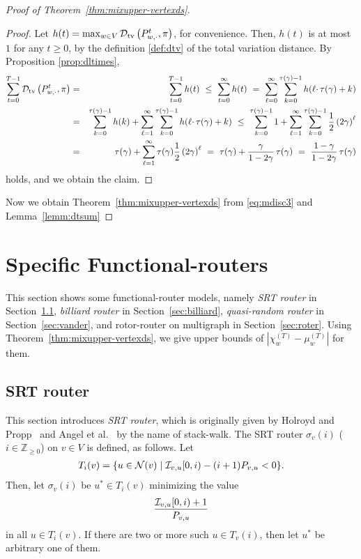 \documentclass[letter, 11pt]{article}
\newcommand{\1}{\mbox{1}\hspace{-0.25em}\mbox{l}}
\newcommand{\I}{{\cal I}} \newcommand{\C}{{\cal C}} \newcommand{\dtv}{{\cal D}_{\rm tv}}
\begin{document}
\begin{proof}[Proof of Theorem~\ref{thm:mixupper-vertexds}]
\begin{proof}Let $h(t) = \max_{w\in V}\dtv\left( P^t_{w, \cdot}, \pi \right)$, for convenience. 
 Then, $h(t)$ is at most $1$ for any $t \geq 0$, by the definition \eqref{def:dtv} of the total variation distance. 
 By Proposition \ref{prop:dltimes}, 
\begin{eqnarray*}
\sum_{t=0}^{T-1} \dtv\left( P^t_{w, \cdot}, \pi \right) 
 &=& \sum_{t=0}^{T-1}h(t) 
 \ \leq \ \sum_{t=0}^{\infty}h(t) 
 \ =\ 
  \sum_{\ell =0}^{\infty} \sum_{k =0}^{\tau(\gamma)-1}
  h(\ell \cdotp \tau(\gamma)+k) \\
 &=& 
  \sum_{k =0}^{\tau(\gamma)-1} h(k) + \sum_{\ell =1}^{\infty} 
  \sum_{k =0}^{\tau(\gamma)-1} h(\ell \cdotp \tau(\gamma)+k) 
\ \leq \  
  \sum_{k =0}^{\tau(\gamma)-1} 1 + \sum_{\ell =1}^{\infty} 
  \sum_{k =0}^{\tau(\gamma)-1} \frac{1}{2}\left( 2\gamma \right)^{\ell} \\
& = &
  \tau(\gamma) + \sum_{\ell =1}^{\infty} \tau(\gamma) \frac{1}{2}\left( 2\gamma \right)^{\ell} 
\ =\ 
  \tau(\gamma)+\frac{\gamma }{1-2\gamma }\, \tau(\gamma)
\ =\ 
  \frac{1-\gamma }{1-2\gamma }\, \tau(\gamma)
\end{eqnarray*}
holds, and we obtain the claim.
\end{proof}

Now we obtain Theorem~\ref{thm:mixupper-vertexds} 
from \eqref{eq:mdisc3} and Lemma~\ref{lemm:dtsum}
\end{proof}

\section{Specific Functional-routers}\label{sec:routingmodel}This section shows some functional-router models, 
   namely {\em SRT router} in Section~\ref{sec:greedy}, 
    {\em billiard router} in Section~\ref{sec:billiard}, 
   {\em quasi-random router} in Section~\ref{sec:vander}, and  
   rotor-router on multigraph  in Section~\ref{sec:roter}. 
Using Theorem~\ref{thm:mixupper-vertexds}, we give upper bounds of $|\chi^{(T)}_w - \mu^{(T)}_w|$ for them. 
\subsection{SRT router}\label{sec:greedy}This section introduces {\em SRT router}, 
  which is originally given by Holroyd and Propp~\cite{HP10} and Angel et al.~\cite{AJJ10} by the name of stack-walk. 
The SRT router $\sigma_v(i)$ ($i \in \mathbb{Z}_{\geq 0}$) on $v \in V$ is defined, as follows. 
Let 
\begin{eqnarray} 
T_i(v)=\{u\in {\cal N}(v)\mid \I_{v,u}[0,i)-(i+1)P_{v,u}<0\}. 
\end{eqnarray}
Then, let $\sigma_v(i)$ be $u^*\in T_i(v)$ minimizing the value 
\begin{eqnarray} 
\frac{\I_{v,u}[0,i)+1}{P_{v,u}}
\end{eqnarray}
in all $u\in T_i(v)$. 
If there are two or more such $u\in T_v(i)$, then let $u^*$ be arbitrary one of them. 
\end{document}
